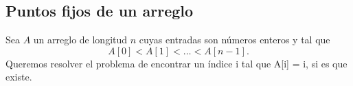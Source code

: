 \subsection{Puntos fijos de un arreglo}
Sea $A$ un arreglo de longitud $n$ cuyas entradas son números enteros y tal que
\[
	A[0] < A[1] < \ldots < A[n - 1]. 
\]
Queremos resolver el problema de encontrar un índice i tal que A[i] = i, si es que
existe.
